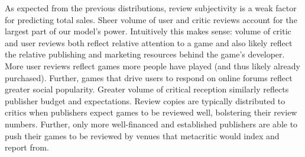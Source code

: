 \documentclass[letterpaper]{article}
\begin{document}

As expected from the previous distributions, review subjectivity is a weak factor for predicting total sales. Sheer volume of user and critic reviews account for the largest part of our model's power. Intuitively this makes sense: volume of critic and user reviews both reflect relative attention to a game and also likely reflect the relative publishing and marketing resources behind the game's developer. More user reviews reflect games more people have played (and thus likely already purchased). Further, games that drive users to respond on online forums reflect greater social popularity. Greater volume of critical reception similarly reflects publisher budget and expectations. Review copies are typically distributed to critics when publishers expect games to be reviewed well, bolstering their review numbers. Further, only more well-financed and established publishers are able to push their games to be reviewed by venues that metacritic would index and report from.
\end{document}
